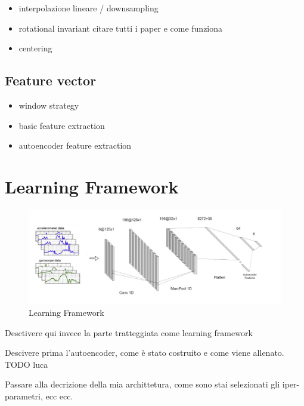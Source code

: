 \begin{itemize}
	\item interpolazione lineare / downsampling
	\item rotational invariant citare tutti i paper e come funziona
	\item centering
\end{itemize}

\subsection{Feature vector}
\begin{itemize}
	\item window strategy
	\item basic feature extraction
	\item autoencoder feature extraction
\end{itemize}

\section{Learning Framework}
\label{sec:learning_framework}

\begin{figure}[h]
	\centering
	\includegraphics[width=1\textwidth]{images/full_architecture.jpg}
	\caption{Learning Framework}
\end{figure}

Desctivere qui invece la parte tratteggiata come learning framework

Descivere prima l'autoencoder, come è stato costruito e come viene allenato. TODO luca

Passare alla decrizione della mia archittetura, come sono stai selezionati gli iper-parametri, ecc ecc.

